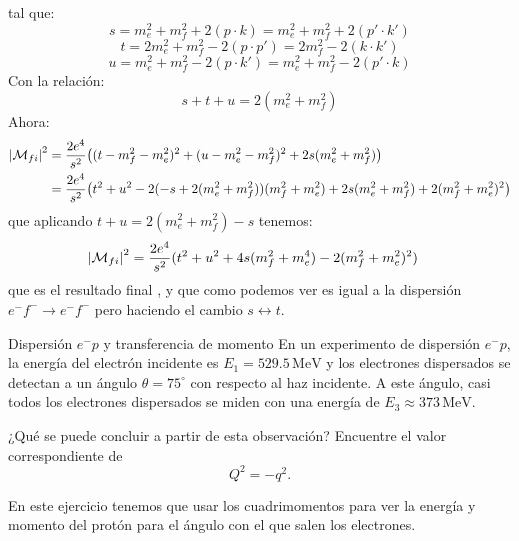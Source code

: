tal que:
\begin{equation}
	s = m_e^2 + m_f^2 +2 (p \cdot k) = m_e^2 + m_f^2 + 2 (p' \cdot k')
\end{equation}
\begin{equation}
	t = 2m_e^2 + m_f^2 -2 (p \cdot p') = 2m_f^2 - 2 (k \cdot k')
\end{equation}
\begin{equation}
	u = m_e^2 + m_f^2 -2 (p \cdot k') = m_e^2 + m_f^2 - 2 (p'\cdot k)
\end{equation}
Con la relación:
\begin{equation}
	s+t+u = 2(m_e^2 + m_f^2)
\end{equation}
Ahora:
\begin{align}
	\vqty{\Mcal_{fi}}^2 & = \frac{2e^4}{s^2} \pqty{(t-m_f^2-m_e^2)^2 + (u-m_e^2-m_f^2)^2  +  2 s(m_e^2 + m_f^2)}        \\
	& = \frac{2e^4}{s^2} \pqty{t^2 + u^2 - 2(-s+2(m_e^2 + m_f^2))(m_f^2 +m_e^2) +  2 s(m_e^2 + m_f^2) + 2(m_f^2 +m_e^2)^2}
\end{align}
que aplicando $ t+u = 2(m_e^2 + m_f^2) -s$ tenemos:
\begin{align}
	\vqty{\Mcal_{fi}}^2 & = \frac{2e^4}{s^2} (t^2 + u^2 + 4s(m_f^2 + m_e^4) - 2(m_f^2+m_e^2)^2)
\end{align}
que es el resultado final \cite{Williams_2022}, y que como podemos ver es igual a la dispersión $e^- f^- \to e^- f^-$ pero haciendo el cambio $s \leftrightarrow t$. 



\begin{Ejercicio}{Dispersión $e^-p$ y transferencia de momento}\label{Ej:14}
	En un experimento de dispersión $e^-p$, la energía del electrón incidente es $E_1 = 529.5\,\mathrm{MeV}$ y los electrones dispersados se detectan a un ángulo $\theta = 75^\circ$ con respecto al haz incidente.
	A este ángulo, casi todos los electrones dispersados se miden con una energía de $E_3 \approx 373\,\mathrm{MeV}$.

	\medskip
	¿Qué se puede concluir a partir de esta observación?
	Encuentre el valor correspondiente de
	\[
		Q^2 = -q^2.
	\]
\end{Ejercicio}

En este ejercicio tenemos que usar los cuadrimomentos para ver la energía y momento del protón para el ángulo con el que salen los electrones. 

